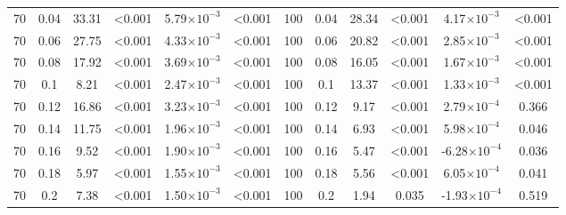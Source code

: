 \documentclass[12pt]{article}
\begin{document}
\begin{table}[hb!]
\begin{tabular}{c c | c c| c c ||c c | c c | c c |}
        70  & 0.04  & 33.31 & \textless0.001  & 5.79$\times10^{-3}$ & \textless0.001  & 100 & 0.04  & 28.34 & \textless0.001  & 4.17$\times10^{-3}$ & \textless0.001  \\
        70  & 0.06  & 27.75 & \textless0.001  & 4.33$\times10^{-3}$ & \textless0.001  & 100 & 0.06  & 20.82 & \textless0.001  & 2.85$\times10^{-3}$ & \textless0.001  \\
        70  & 0.08  & 17.92 & \textless0.001  & 3.69$\times10^{-3}$ & \textless0.001  & 100 & 0.08  & 16.05 & \textless0.001  & 1.67$\times10^{-3}$ & \textless0.001  \\
        70  & 0.1 & 8.21  & \textless0.001  & 2.47$\times10^{-3}$ & \textless0.001  & 100 & 0.1 & 13.37 & \textless0.001  & 1.33$\times10^{-3}$ & \textless0.001  \\
        70  & 0.12  & 16.86 & \textless0.001  & 3.23$\times10^{-3}$ & \textless0.001  & 100 & 0.12  & 9.17  & \textless0.001  & 2.79$\times10^{-4}$ & 0.366 \\
        70  & 0.14  & 11.75 & \textless0.001  & 1.96$\times10^{-3}$ & \textless0.001  & 100 & 0.14  & 6.93  & \textless0.001  & 5.98$\times10^{-4}$ & 0.046 \\
        70  & 0.16  & 9.52  & \textless0.001  & 1.90$\times10^{-3}$ & \textless0.001  & 100 & 0.16  & 5.47  & \textless0.001  & -6.28$\times10^{-4}$  & 0.036 \\
        70  & 0.18  & 5.97  & \textless0.001  & 1.55$\times10^{-3}$ & \textless0.001  & 100 & 0.18  & 5.56  & \textless0.001  & 6.05$\times10^{-4}$ & 0.041 \\
        70  & 0.2 & 7.38  & \textless0.001  & 1.50$\times10^{-3}$ & \textless0.001  & 100 & 0.2 & 1.94  & 0.035 & -1.93$\times10^{-4}$  & 0.519 \\
        \hline
	    \end{tabular}
	    \end{table}
\end{document}
